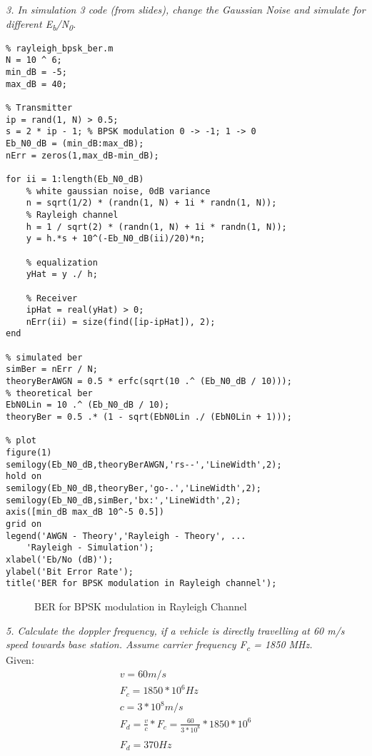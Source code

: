 \documentclass[a4paper]{article}
\begin{document}
\textit{3. In simulation 3 code (from slides), change the Gaussian Noise and simulate for different E\textsubscript b/N\textsubscript0.}\\
\bigskip
\begin{verbatim}
% rayleigh_bpsk_ber.m
N = 10 ^ 6;
min_dB = -5;
max_dB = 40;

% Transmitter
ip = rand(1, N) > 0.5;
s = 2 * ip - 1; % BPSK modulation 0 -> -1; 1 -> 0
Eb_N0_dB = (min_dB:max_dB);
nErr = zeros(1,max_dB-min_dB);

for ii = 1:length(Eb_N0_dB)
    % white gaussian noise, 0dB variance
    n = sqrt(1/2) * (randn(1, N) + 1i * randn(1, N));
    % Rayleigh channel
    h = 1 / sqrt(2) * (randn(1, N) + 1i * randn(1, N));
    y = h.*s + 10^(-Eb_N0_dB(ii)/20)*n;
 
    % equalization
    yHat = y ./ h;
 
    % Receiver
    ipHat = real(yHat) > 0;
    nErr(ii) = size(find([ip-ipHat]), 2);
end

% simulated ber
simBer = nErr / N;
theoryBerAWGN = 0.5 * erfc(sqrt(10 .^ (Eb_N0_dB / 10)));
% theoretical ber
EbN0Lin = 10 .^ (Eb_N0_dB / 10);
theoryBer = 0.5 .* (1 - sqrt(EbN0Lin ./ (EbN0Lin + 1)));

% plot
figure(1)
semilogy(Eb_N0_dB,theoryBerAWGN,'rs--','LineWidth',2);
hold on
semilogy(Eb_N0_dB,theoryBer,'go-.','LineWidth',2);
semilogy(Eb_N0_dB,simBer,'bx:','LineWidth',2);
axis([min_dB max_dB 10^-5 0.5])
grid on
legend('AWGN - Theory','Rayleigh - Theory', ...
    'Rayleigh - Simulation');
xlabel('Eb/No (dB)');
ylabel('Bit Error Rate');
title('BER for BPSK modulation in Rayleigh channel');
\end{verbatim}
\begin{figure}[hbt!]
  \centering
  
  \caption{BER for BPSK modulation in Rayleigh Channel}
\end{figure}

\newpage
\textit{5. Calculate the doppler frequency, if a vehicle is directly travelling at 60 m/s speed towards base station. Assume carrier frequency F\textsubscript c = 1850 MHz.}\\
\bigskip
Given:
\begin{gather*} 
v = 60 m/s\\
F_c = 1850 * 10^6 Hz\\
c = 3 * 10^8 m/s\\
F_d = \frac{v}{c} * F_c
    = \frac{60}{3 * 10^8} * 1850 * 10^6\\
\\
F_d = 370 Hz
\end{gather*}
\end{document}
